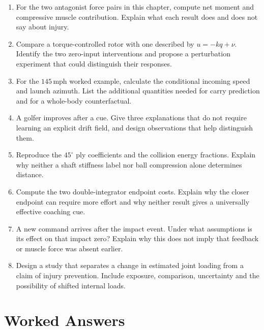 \begin{enumerate}[leftmargin=*]
\item For the two antagonist force pairs in this chapter, compute net moment and compressive muscle contribution. Explain what each result does and does not say about injury.
\item Compare a torque-controlled rotor with one described by $u=-kq+\nu$. Identify the two zero-input interventions and propose a perturbation experiment that could distinguish their responses.
\item For the $145\,\mathrm{mph}$ worked example, calculate the conditional incoming speed and launch azimuth. List the additional quantities needed for carry prediction and for a whole-body counterfactual.
\item A golfer improves after a cue. Give three explanations that do not require learning an explicit drift field, and design observations that help distinguish them.
\item Reproduce the $45^\circ$ ply coefficients and the collision energy fractions. Explain why neither a shaft stiffness label nor ball compression alone determines distance.
\item Compute the two double-integrator endpoint costs. Explain why the closer endpoint can require more effort and why neither result gives a universally effective coaching cue.
\item A new command arrives after the impact event. Under what assumptions is its effect on that impact zero? Explain why this does not imply that feedback or muscle force was absent earlier.
\item Design a study that separates a change in estimated joint loading from a claim of injury prevention. Include exposure, comparison, uncertainty and the possibility of shifted internal loads.
\end{enumerate}

\section{Worked Answers}

